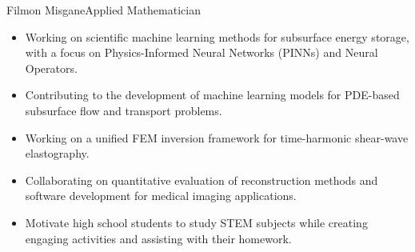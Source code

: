\documentclass{article}
\begin{document}
\begin{cv}{Filmon Misgane}{Applied Mathematician}
    \begin{cvevent}[04.2026][Present]  
        \begin{itemize}
            \item Working on scientific machine learning methods for subsurface energy storage, with a focus on Physics-Informed Neural Networks (PINNs) and Neural Operators.
            \item Contributing to the development of machine learning models for PDE-based subsurface flow and transport problems.
        \end{itemize}
        \hrulefill
    \end{cvevent}
    \begin{cvevent}[04.2026][Present]  
        \begin{itemize}
            \item Working on a unified FEM inversion framework for time-harmonic shear-wave elastography.
            \item Collaborating on quantitative evaluation of reconstruction methods and software development for medical imaging applications.
        \end{itemize}
        \hrulefill
    \end{cvevent}
    \begin{cvevent}[08.2022][Present]  
        \begin{itemize}
            \item Motivate high school students to study STEM subjects while creating engaging activities and assisting with their homework.
        \end{itemize}
        \hrulefill
    \end{cvevent}




\end{cv}
\end{document}
